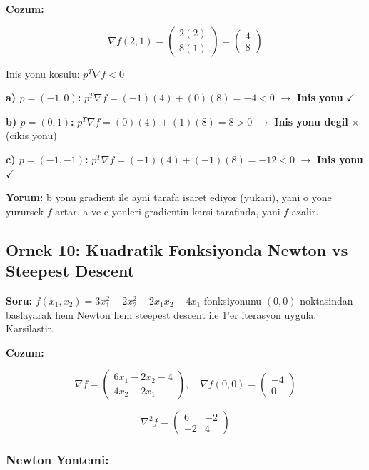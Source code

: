 \documentclass[12pt,a4paper]{article}
\theoremstyle{definition}
\theoremstyle{remark}
\begin{document}
\bigskip
\textbf{Cozum:}

\[
\nabla f(2,1) = \begin{pmatrix} 2(2) \\ 8(1) \end{pmatrix} = \begin{pmatrix} 4 \\ 8 \end{pmatrix}
\]

Inis yonu kosulu: $p^T \nabla f < 0$

\textbf{a) $p = (-1, 0)$:}
$p^T \nabla f = (-1)(4) + (0)(8) = -4 < 0$ $\rightarrow$ \textbf{Inis yonu} $\checkmark$

\textbf{b) $p = (0, 1)$:}
$p^T \nabla f = (0)(4) + (1)(8) = 8 > 0$ $\rightarrow$ \textbf{Inis yonu degil} $\times$  (cikis yonu)

\textbf{c) $p = (-1, -1)$:}
$p^T \nabla f = (-1)(4) + (-1)(8) = -12 < 0$ $\rightarrow$ \textbf{Inis yonu} $\checkmark$

\textbf{Yorum:} b yonu gradient ile ayni tarafa isaret ediyor (yukari), yani o yone yurursek $f$ artar. a ve c yonleri gradientin karsi tarafinda, yani $f$ azalir.

\subsection{Ornek 10: Kuadratik Fonksiyonda Newton vs Steepest Descent}

\textbf{Soru:} $f(x_1, x_2) = 3x_1^2 + 2x_2^2 - 2x_1 x_2 - 4x_1$ fonksiyonunu $(0, 0)$ noktasindan baslayarak hem Newton hem steepest descent ile 1'er iterasyon uygula. Karsilastir.

\bigskip
\textbf{Cozum:}

\[
\nabla f = \begin{pmatrix} 6x_1 - 2x_2 - 4 \\ 4x_2 - 2x_1 \end{pmatrix}, \quad \nabla f(0,0) = \begin{pmatrix} -4 \\ 0 \end{pmatrix}
\]

\[
\nabla^2 f = \begin{pmatrix} 6 & -2 \\ -2 & 4 \end{pmatrix}
\]

\subsubsection{Newton Yontemi:}
\end{document}
